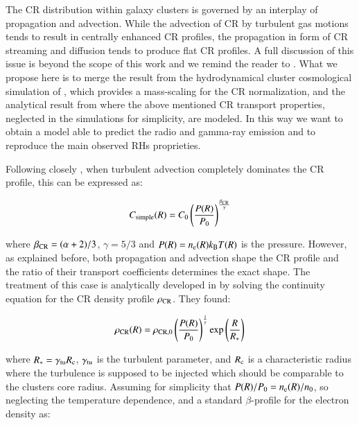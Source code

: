 \documentclass[traditabstract]{aa}
\newcommand{\rmn}{\mathrm}
\begin{document}
The CR distribution within galaxy clusters is governed by an interplay of
propagation and advection. While the advection of CR by turbulent gas motions
tends to result in centrally enhanced CR profiles, the propagation in form of CR
streaming and diffusion tends to produce flat CR profiles. A full discussion of
this issue is beyond the scope of this work and we remind the reader to
\cite{2011A&A...527A..99E}. What we propose here is to merge the result from the
hydrodynamical cluster cosmological simulation of \cite{2010MNRAS.409..449P},
which provides a mass-scaling for the CR normalization, and the analytical
result from \cite{2011A&A...527A..99E} where the above mentioned CR transport
properties, neglected in the \cite{2010MNRAS.409..449P} simulations for
simplicity, are modeled. In this way we want to obtain a model able to predict
the radio and gamma-ray emission and to reproduce the main observed RHs
proprieties.

Following closely \cite{2011A&A...527A..99E}, when turbulent advection completely dominates the CR profile, this can be expressed as:

\begin{equation}
C_{\rm{simple}}(R) = C_{0} \left( \frac{P(R)}{P_{0}} \right)^{\frac{\beta_{\rm{CR}}}{\gamma}}
\label{eq:Csimple}
\end{equation} 

where $\beta_{\rm{CR}}=(\alpha+2)/3$, $\gamma=5/3$ and $P(R)=n_{\rm{e}}(R) k_{\rm{B}} T(R)$ is the pressure. However, as explained before, both propagation and advection shape the CR profile and the ratio of their transport coefficients determines the exact shape. The treatment of this case is analytically developed in \cite{2011A&A...527A..99E} by solving the continuity equation for the CR density profile $\rho_{\rm{CR}}$. They found:

\begin{equation}
\rho_{\rm{CR}}(R) = \rho_{\rm{CR},0} \left( \frac{P(R)}{P_{0}} \right)^{\frac{1}{\gamma}} \rmn{exp} \left( \frac{R}{R_{*}} \right)
\label{eg:rhoCR}
\end{equation} 

where $R_{*}=\gamma_{\rm{\rm{tu}}}R_{\rm{c}}$, $\gamma_{\rm{tu}}$ is the turbulent parameter, and $R_{\rm{c}}$ is a characteristic radius where the turbulence is supposed to be injected which should be comparable to the clusters core radius. Assuming for simplicity that $P(R)/P_{0}=n_{\rm{e}}(R)/n_{0}$, so neglecting the temperature dependence, and a standard $\beta$-profile for the electron density as:
\end{document}
